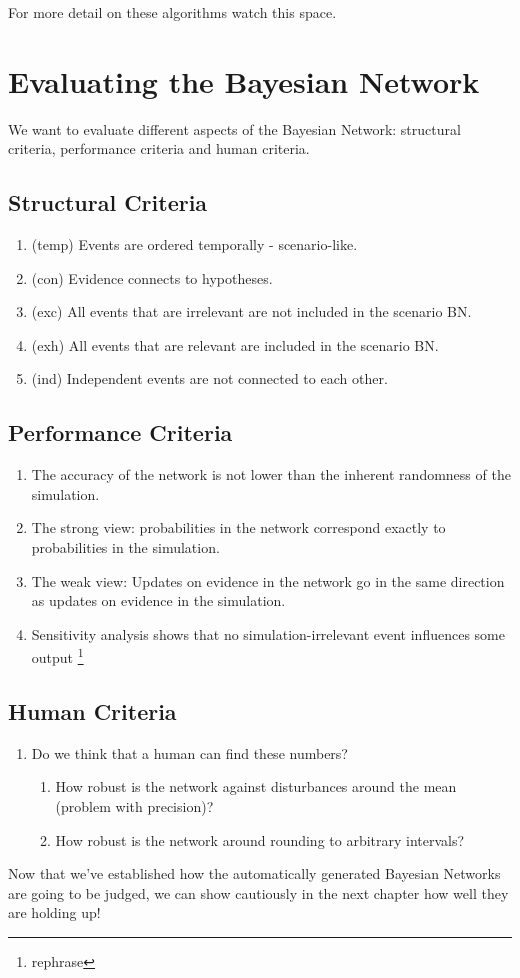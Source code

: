 For more detail on these algorithms watch this space.




\section{Evaluating the Bayesian Network}

We want to evaluate different aspects of the Bayesian Network: structural criteria, performance criteria and human criteria.

\subsection{Structural Criteria}
\begin{enumerate}
\item (temp) Events are ordered temporally - scenario-like.
\item (con) Evidence connects to hypotheses.
\item (exc) All events that are irrelevant are not included in the scenario BN.
\item (exh) All events that are relevant are included in the scenario BN.
\item (ind) Independent events are not connected to each other.
\end{enumerate}

\subsection{Performance Criteria}
\begin{enumerate}
\item The accuracy of the network is not lower than the inherent randomness of the simulation.
\item The strong view: probabilities in the network correspond exactly to probabilities in the simulation.
\item The weak view: Updates on evidence in the network go in the same direction as updates on evidence in the simulation.
\item Sensitivity analysis shows that no simulation-irrelevant event influences some output \footnote{rephrase}
\end{enumerate}

\subsection{Human Criteria}
\begin{enumerate}
\item Do we think that a human can find these numbers?
	\begin{enumerate}
	\item How robust is the network against disturbances around the mean (problem with precision)?
	\item How robust is the network around rounding to arbitrary intervals?
	\end{enumerate}
\end{enumerate}

Now that we've established how the automatically generated Bayesian Networks are going to be judged, we can show cautiously in the next chapter how well they are holding up!


